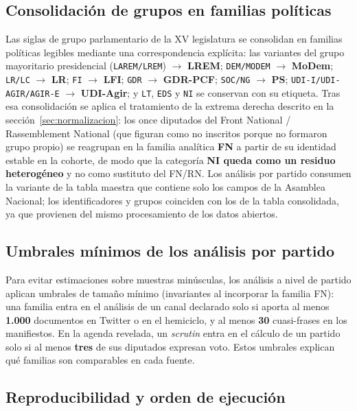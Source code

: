\subsection*{Consolidación de grupos en familias políticas}

Las siglas de grupo parlamentario de la XV legislatura se consolidan en familias
políticas legibles mediante una correspondencia explícita: las variantes del
grupo mayoritario presidencial (\texttt{LAREM/LREM}) $\rightarrow$ \textbf{LREM};
\texttt{DEM/MODEM} $\rightarrow$ \textbf{MoDem}; \texttt{LR/LC} $\rightarrow$
\textbf{LR}; \texttt{FI} $\rightarrow$ \textbf{LFI}; \texttt{GDR} $\rightarrow$
\textbf{GDR-PCF}; \texttt{SOC/NG} $\rightarrow$ \textbf{PS};
\texttt{UDI-I/UDI-AGIR/AGIR-E} $\rightarrow$ \textbf{UDI-Agir}; y \texttt{LT},
\texttt{EDS} y \texttt{NI} se conservan con su etiqueta. Tras esa consolidación
se aplica el tratamiento de la extrema derecha descrito en la
sección~\ref{sec:normalizacion}: los once diputados del Front National /
Rassemblement National (que figuran como no inscritos porque no formaron grupo
propio) se reagrupan en la familia analítica \textbf{FN} a partir de su
identidad estable en la cohorte, de modo que la categoría \textbf{NI queda como
un residuo heterogéneo} y no como sustituto del FN/RN. Los análisis por partido
consumen la variante de la tabla maestra que contiene solo los campos de la
Asamblea Nacional; los identificadores y grupos coinciden con los de la tabla
consolidada, ya que provienen del mismo procesamiento de los datos abiertos.

\subsection*{Umbrales mínimos de los análisis por partido}

Para evitar estimaciones sobre muestras minúsculas, los análisis a nivel de
partido aplican umbrales de tamaño mínimo (invariantes al incorporar la familia
FN): una familia entra en el análisis de un canal declarado solo si aporta al
menos \textbf{1.000} documentos en Twitter o en el hemiciclo, y al menos
\textbf{30} cuasi-frases en los manifiestos. En la agenda revelada, un
\emph{scrutin} entra en el cálculo de un partido solo si al menos \textbf{tres}
de sus diputados expresan voto. Estos umbrales explican qué familias son
comparables en cada fuente.

\subsection{Reproducibilidad y orden de ejecución}
\label{anexo:reproducibilidad}

